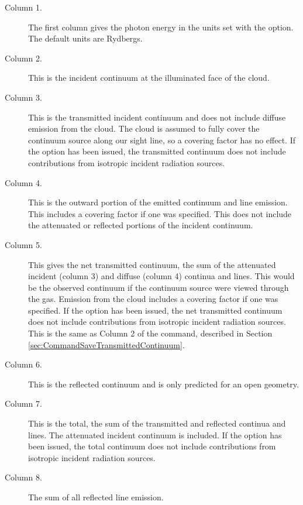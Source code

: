 \begin{description}
\item[Column 1.]  The first column gives the photon energy in the units set
with the  option.  The default
units are Rydbergs.

\item[Column 2.]  This is the incident continuum at the illuminated face of
the cloud.

\item[Column 3.]  This is the transmitted incident continuum and does not include
diffuse emission from the cloud.
The cloud is assumed to fully cover the continuum source along our sight line, so a covering
factor has no effect.
If the option  has been issued, the transmitted continuum
does not include contributions from isotropic incident radiation sources.

\item[Column 4.]  This is the outward portion of the emitted continuum and line
emission.  This includes a covering factor if one was specified.
This does not include
the attenuated or reflected portions of the incident continuum.

\item[Column 5.]  This gives the net transmitted continuum,
the sum of the
attenuated incident (column 3) and diffuse (column 4) continua and lines.
This would be the observed continuum if the continuum source were viewed
through the gas.  Emission from the cloud includes a covering factor if one was specified.
If the option  has been issued, the net transmitted continuum
does not include contributions from isotropic incident radiation sources.
This is the same as Column 2 of the  command,
described in Section \ref{sec:CommandSaveTransmittedContinuum}.

\item[Column 6.]  This is the reflected continuum
and is only predicted for an open geometry.

\item[Column 7.]  This is the total, the sum of the transmitted and reflected continua
and lines.  The attenuated incident continuum is included.
If the option  has been issued, the total continuum
does not include contributions from isotropic incident radiation sources.

\item[Column 8.] The sum of all reflected line emission.


\end{description}
